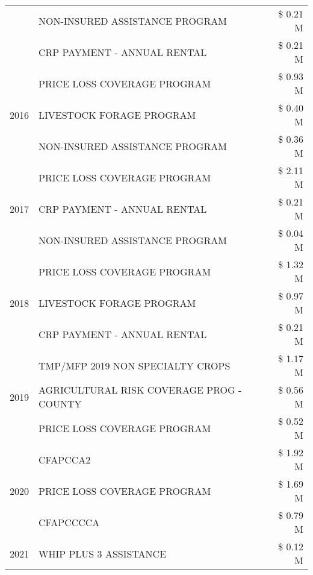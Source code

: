 \begin{tabular}{llr}
 & NON-INSURED ASSISTANCE PROGRAM & \$ 0.21 M \\
 & CRP PAYMENT - ANNUAL RENTAL & \$ 0.21 M \\
\cline{1-3}
\multirow[t]{3}{*}{2016} & PRICE LOSS COVERAGE PROGRAM & \$ 0.93 M \\
 & LIVESTOCK FORAGE PROGRAM & \$ 0.40 M \\
 & NON-INSURED ASSISTANCE PROGRAM & \$ 0.36 M \\
\cline{1-3}
\multirow[t]{3}{*}{2017} & PRICE LOSS COVERAGE PROGRAM & \$ 2.11 M \\
 & CRP PAYMENT - ANNUAL RENTAL & \$ 0.21 M \\
 & NON-INSURED ASSISTANCE PROGRAM & \$ 0.04 M \\
\cline{1-3}
\multirow[t]{3}{*}{2018} & PRICE LOSS COVERAGE PROGRAM & \$ 1.32 M \\
 & LIVESTOCK FORAGE PROGRAM & \$ 0.97 M \\
 & CRP PAYMENT - ANNUAL RENTAL & \$ 0.21 M \\
\cline{1-3}
\multirow[t]{3}{*}{2019} & TMP/MFP 2019 NON SPECIALTY CROPS & \$ 1.17 M \\
 & AGRICULTURAL RISK COVERAGE PROG - COUNTY & \$ 0.56 M \\
 & PRICE LOSS COVERAGE PROGRAM & \$ 0.52 M \\
\cline{1-3}
\multirow[t]{3}{*}{2020} & CFAPCCA2 & \$ 1.92 M \\
 & PRICE LOSS COVERAGE PROGRAM & \$ 1.69 M \\
 & CFAPCCCCA & \$ 0.79 M \\
\cline{1-3}
2021 & WHIP PLUS 3 ASSISTANCE & \$ 0.12 M \\
\cline{1-3}
\bottomrule
\end{tabular}
